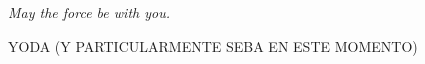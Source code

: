 \begin{dedication}
	\thispagestyle{empty}
	\null\vfill

	\begin{centering}
		\parbox{10.5cm}{%
			\raggedright{\LARGE\itshape%
				May the force be with you.\\ \vspace{0.35cm}
				\par{}\bigskip{}} %
			\raggedleft\large\MakeUppercase{Yoda (y particularmente Seba en este momento)}\par%
		}
	\end{centering}

	\hfill

	\vfill
\end{dedication}